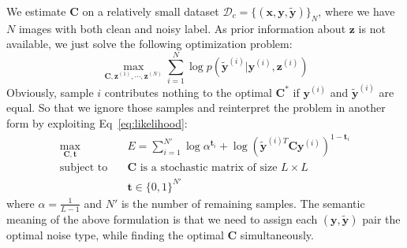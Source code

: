 \documentclass[10pt,twocolumn,letterpaper]{article}
\def\vec{\mathbf}
\def\mat{\mathbf}
\begin{document}
We estimate $\mat{C}$ on a relatively small dataset $\mathcal{D}_c = \{(\vec{x},\vec{y},\tilde{\vec{y}})\}_N$, where we have $N$ images with both clean and noisy label. As prior information about $\vec{z}$ is not available, we just solve the following optimization problem:
\begin{equation}
    \max_{\mat{C},\vec{z}^{(1)},\cdots,\vec{z}^{(N)}} \sum_{i=1}^N \log p(\tilde{\vec{y}}^{(i)}|\vec{y}^{(i)},\vec{z}^{(i)})
\end{equation}
Obviously, sample $i$ contributes nothing to the optimal $\mat{C}^*$ if $\vec{y}^{(i)}$ and $\tilde{\vec{y}}^{(i)}$ are equal. So that we ignore those samples and reinterpret the problem in another form by exploiting Eq~\ref{eq:likelihood}:
\begin{equation}
\begin{aligned}
\max_{\mat{C},\vec{t}} \quad & E=\sum_{i=1}^{N'} \log \alpha^{\vec{t}_i} + \log (\tilde{\vec{y}}^{(i)T} \mat{C} \vec{y}^{(i)})^{1-\vec{t}_i}\\
\text{subject to} \quad & \mat{C} \text{ is a stochastic matrix of size } L\times L \\
                    & \vec{t} \in \{0,1\}^{N'}
\end{aligned}
\end{equation}
where $\alpha=\frac{1}{L-1}$ and $N'$ is the number of remaining samples. The semantic meaning of the above formulation is that we need to assign each $(\vec{y},\tilde{\vec{y}})$ pair the optimal noise type, while finding the optimal $\mat{C}$ simultaneously.
\end{document}
